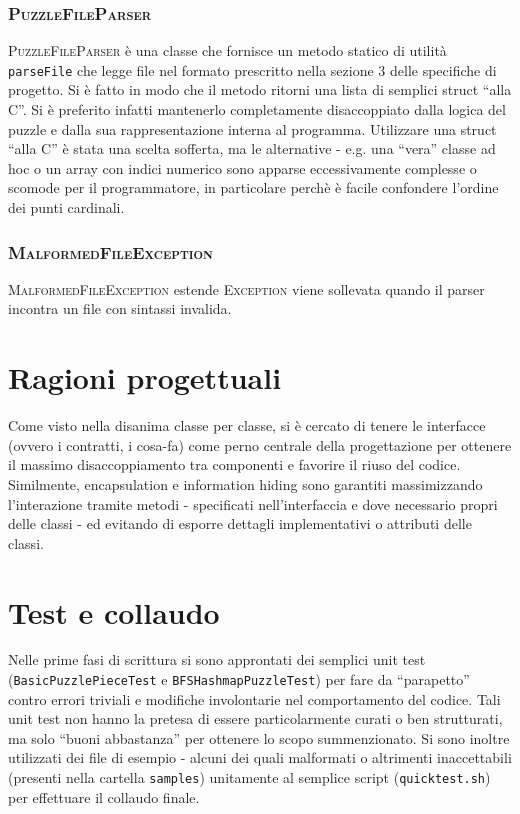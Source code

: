 \documentclass[a4paper]{article}
\newcommand{\Classname}[1]{\textsc{#1}}
\newcommand{\Methodname}[1]{\texttt{#1}}
\begin{document}
\subsubsection{\Classname{PuzzleFileParser}}
\Classname{PuzzleFileParser} \`e una classe che fornisce un metodo statico di utilit\`a \Methodname{parseFile} che legge file nel formato prescritto nella sezione 3 delle specifiche di progetto.
Si \`e fatto in modo che il metodo ritorni una lista di semplici struct ``alla C''.
Si \`e preferito infatti mantenerlo completamente disaccoppiato dalla logica del puzzle e dalla sua rappresentazione interna al programma.
Utilizzare una struct ``alla C'' \`e stata una scelta sofferta, ma le alternative - e.g. una ``vera'' classe ad hoc o un array con indici numerico sono apparse eccessivamente complesse o scomode per il programmatore, in particolare perch\`e \`e facile confondere l'ordine dei punti cardinali.

\subsubsection{\Classname{MalformedFileException}}
\Classname{MalformedFileException} estende \Classname{Exception} viene sollevata quando il parser incontra un file con sintassi invalida.
\section{Ragioni progettuali}
Come visto nella disanima classe per classe, si \`e cercato di tenere le interfacce (ovvero i contratti, i cosa-fa) come perno centrale della progettazione per ottenere il massimo disaccoppiamento tra componenti e favorire il riuso del codice.
Similmente, encapsulation e information hiding sono garantiti massimizzando l'interazione tramite metodi - specificati nell'interfaccia e dove necessario propri delle classi - ed evitando di esporre dettagli implementativi o attributi delle classi.

\section{Test e collaudo}
Nelle prime fasi di scrittura si sono approntati dei semplici unit test (\texttt{Basic\-Puzzle\-Piece\-Test} e \texttt{BFS\-Hash\-map\-Puzzle\-Test}) per fare da ``parapetto'' contro errori triviali e modifiche involontarie nel comportamento del codice.
Tali unit test non hanno la pretesa di essere particolarmente curati o ben strutturati, ma solo ``buoni abbastanza'' per ottenere lo scopo summenzionato.
Si sono inoltre utilizzati dei file di esempio - alcuni dei quali malformati o altrimenti inaccettabili (presenti nella cartella \texttt{samples}) unitamente al semplice script (\texttt{quicktest.sh}) per effettuare il collaudo finale.
\end{document}
